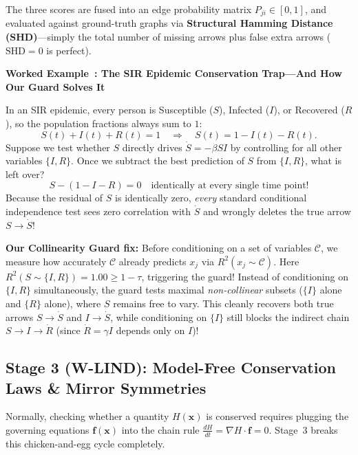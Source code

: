 \documentclass[11pt,a4paper]{article}
\newcounter{workedexcnt}
\newenvironment{workedexample}[1]{%
  \refstepcounter{workedexcnt}%
  \begin{lrbox}{\calloutbox}%
    \begin{minipage}{\dimexpr\textwidth-2\fboxsep-2\fboxrule\relax}
      \vspace{0.3em}
      \noindent\textbf{\color{black!85}Worked Example~\theworkedexcnt: #1}\par\smallskip
      \normalfont
}{%
      \vspace{0.3em}
    \end{minipage}%
  \end{lrbox}%
  \par\medskip\noindent
  \fcolorbox{gray!45}{gray!8}{\usebox{\calloutbox}}%
  \par\medskip
}
\begin{document}
The three scores are fused into an edge probability matrix $P_{ji} \in [0, 1]$, and evaluated against ground-truth graphs via \textbf{Structural Hamming Distance (SHD)}—simply the total number of missing arrows plus false extra arrows ($\text{SHD} = 0$ is perfect).

\begin{workedexample}{The SIR Epidemic Conservation Trap—And How Our Guard Solves It}
In an SIR epidemic, every person is Susceptible ($S$), Infected ($I$), or Recovered ($R$), so the population fractions always sum to $1$:
\begin{equation}
  S(t) + I(t) + R(t) = 1 \quad \Longrightarrow \quad S(t) = 1 - I(t) - R(t).
\end{equation}
Suppose we test whether $S$ directly drives $\dot{S} = -\beta S I$ by controlling for all other variables $\{I, R\}$. Once we subtract the best prediction of $S$ from $\{I, R\}$, what is left over?
\begin{equation}
  S - (1 - I - R) = 0 \quad \text{identically at every single time point!}
\end{equation}
Because the residual of $S$ is identically zero, \emph{every} standard conditional independence test sees zero correlation with $\dot{S}$ and wrongly deletes the true arrow $S \to \dot{S}$!

\textbf{Our Collinearity Guard fix:} Before conditioning on a set of variables $\mathcal{C}$, we measure how accurately $\mathcal{C}$ already predicts $x_j$ via $R^2(x_j \sim \mathcal{C})$. Here $R^2(S \sim \{I, R\}) = 1.00 \ge 1 - \tau$, triggering the guard! Instead of conditioning on $\{I, R\}$ simultaneously, the guard tests maximal \emph{non-collinear} subsets ($\{I\}$ alone and $\{R\}$ alone), where $S$ remains free to vary. This cleanly recovers both true arrows $S \to \dot{S}$ and $I \to \dot{S}$, while conditioning on $\{I\}$ still blocks the indirect chain $S \to I \to \dot{R}$ (since $\dot{R} = \gamma I$ depends only on $I$)!
\end{workedexample}

\subsection{Stage 3 (W-LIND): Model-Free Conservation Laws \& Mirror Symmetries}
Normally, checking whether a quantity $H(\mathbf{x})$ is conserved requires plugging the governing equations $\mathbf{f}(\mathbf{x})$ into the chain rule $\frac{dH}{dt} = \nabla H \cdot \mathbf{f} = 0$. Stage~3 breaks this chicken-and-egg cycle completely.
\end{document}

